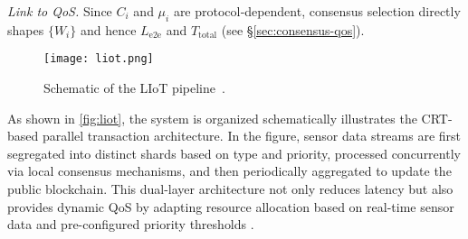 \documentclass[12pt,onecolumn]{IEEEtran} %
\begin{document}
\noindent\textit{Link to QoS.} Since $C_i$ and $\mu_i$ are protocol‑dependent, consensus selection directly shapes $\{W_i\}$ and hence $L_{\mathrm{e2e}}$ and $T_{\mathrm{total}}$ (see §\ref{sec:consensus-qos}).

\begin{figure}[htbp]
  \centering
  \texttt{[image: liot.png]}
  \caption{Schematic of the LIoT pipeline~\cite{thiruvenkatasamy2025anonlinetool}.}
  \label{fig:liot}
\end{figure}

As shown in \autoref{fig:liot}, the system is organized schematically illustrates the CRT-based parallel transaction architecture. In the figure, sensor data streams are first segregated into distinct shards based on type and priority, processed concurrently via local consensus mechanisms, and then periodically aggregated to update the public blockchain. This dual-layer architecture not only reduces latency but also provides dynamic QoS by adapting resource allocation based on real-time sensor data and pre-configured priority thresholds \cite{thiruvenkatasamy2025anonlinetool, huang2025digitaltraceabilityin}.
\end{document}
